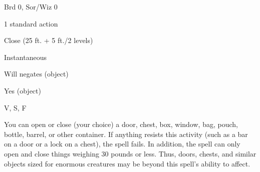 
\begin{description*}
\item[Level:] Brd 0, Sor/Wiz 0
\item[Casting Time:] 1 standard action
\item[Range:] Close (25 ft. + 5 ft./2 levels)
\item[Duration:] Instantaneous
\item[Saving Throw:] Will negates (object)
\item[Spell Resistance:] Yes (object)
\item[Components:] V, S, F
\end{description*}

You can open or close (your choice) a door, chest, box, window, bag, pouch, bottle,
barrel, or other container. If anything resists this activity (such as a bar on
a door or a lock on a chest), the spell fails. In addition, the spell can only
open and close things weighing 30 pounds or less. Thus, doors, chests, and similar
objects sized for enormous creatures may be beyond this spell's ability to affect.